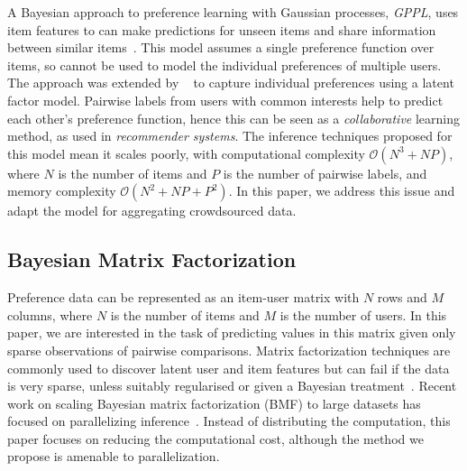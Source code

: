 A Bayesian approach to preference learning with Gaussian processes, \emph{GPPL}, 
uses item features to can make predictions for unseen items and
share information between similar items~\citep{chu2005preference}.
 This model assumes a single preference function over items, so cannot
be used to model the individual preferences of multiple users.
The approach was extended by ~\citet{houlsby2012collaborative}
to capture individual preferences using a latent factor model. 
Pairwise labels from users with common interests help to predict each other's preference function, hence 
this can be seen as a \emph{collaborative} learning method, as used in \emph{recommender systems}.
The inference techniques proposed for this model mean it scales poorly, with computational complexity $\mathcal{O}(N^3 + NP)$, where $N$ is the number of items and $P$ is the number of pairwise labels, and memory complexity $\mathcal{O}(N^2 + NP + P^2)$. In this paper, we address this issue and adapt the model for aggregating crowdsourced data.


\subsection{Bayesian Matrix Factorization}

Preference data can be represented as an item-user matrix with $N$ rows and $M$ columns, 
where $N$ is the number of items and $M$ is the number of users.
In this paper, we are interested in the task of predicting values in this matrix
given only sparse observations of pairwise comparisons.
Matrix factorization techniques are commonly used to discover latent user and item features but 
can fail if the data is very sparse, unless suitably regularised or given 
a Bayesian treatment~\citep{salakhutdinov2008bayesian}. 
Recent work on scaling Bayesian matrix factorization (BMF) to large datasets has focused on parallelizing 
inference~\citep{ahn2015large,vander2017distributed,chen2018large}. Instead of distributing the computation,
this paper focuses on reducing the computational cost, although the method we propose is amenable
to parallelization.

